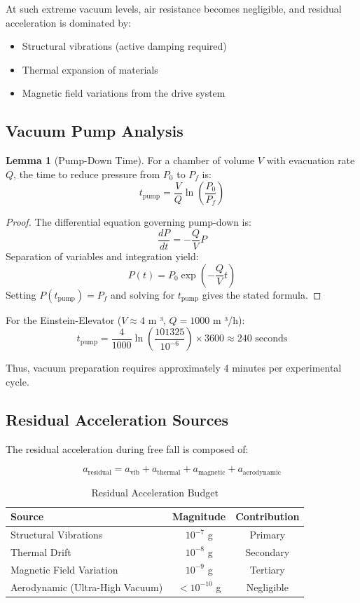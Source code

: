 ﻿\documentclass[a4paper,12pt]{article}
\theoremstyle{definition}
\newtheorem{lemma}{Lemma}
\begin{document}
At such extreme vacuum levels, air resistance becomes negligible, and residual acceleration is dominated by:
\begin{itemize}
	\item Structural vibrations (active damping required)
	\item Thermal expansion of materials
	\item Magnetic field variations from the drive system
\end{itemize}

\subsection{Vacuum Pump Analysis}

\begin{lemma}[Pump-Down Time]
For a chamber of volume $V$ with evacuation rate $Q$, the time to reduce pressure from $P_0$ to $P_f$ is:
\[
t_{\text{pump}} = \frac{V}{Q} \ln\left(\frac{P_0}{P_f}\right)
\]
\end{lemma}

\begin{proof}
The differential equation governing pump-down is:
\[
\frac{dP}{dt} = -\frac{Q}{V} P
\]
Separation of variables and integration yield:
\[
P(t) = P_0 \exp\left(-\frac{Q}{V}t\right)
\]
Setting $P(t_{\text{pump}}) = P_f$ and solving for $t_{\text{pump}}$ gives the stated formula. \qedhere
\end{proof}

For the Einstein-Elevator ($V \approx 4$ m ³, $Q = 1000$ m ³/h):
\[
t_{\text{pump}} = \frac{4}{1000} \ln\left(\frac{101325}{10^{-6}}\right) \times 3600 \approx 240 \text{ seconds}
\]

Thus, vacuum preparation requires approximately 4 minutes per experimental cycle.

\subsection{Residual Acceleration Sources}

The residual acceleration during free fall is composed of:

\begin{equation}
a_{\text{residual}} = a_{\text{vib}} + a_{\text{thermal}} + a_{\text{magnetic}} + a_{\text{aerodynamic}}
\end{equation}

\begin{table}[h]
\centering
\begin{tabular}{|l|c|c|}
\hline
\textbf{Source} & \textbf{Magnitude} & \textbf{Contribution} \\
\hline
Structural Vibrations & $10^{-7}$ g & Primary \\
Thermal Drift & $10^{-8}$ g & Secondary \\
Magnetic Field Variation & $10^{-9}$ g & Tertiary \\
Aerodynamic (Ultra-High Vacuum) & $< 10^{-10}$ g & Negligible \\
\hline
\end{tabular}
\caption{Residual Acceleration Budget}
\end{table}
\end{document}
